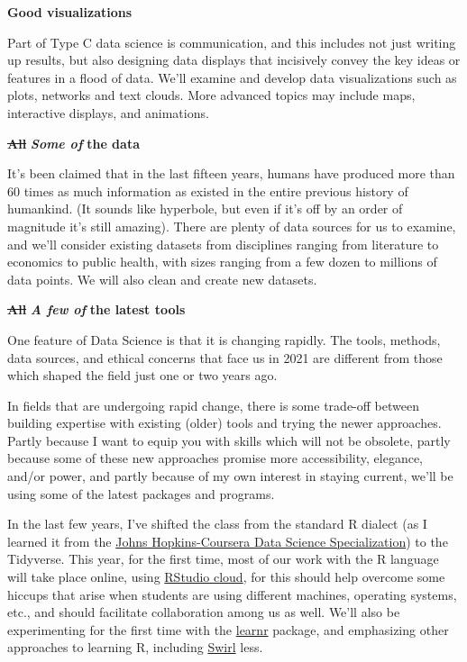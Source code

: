 \documentclass[
  openany]{book}
\begin{document}
\textbf{Good visualizations}

Part of Type C data science is communication, and this includes not just writing up results, but also designing data displays that incisively convey the key ideas or features in a flood of data. We'll examine and develop data visualizations such as plots, networks and text clouds. More advanced topics may include maps, interactive displays, and animations.

\sout{\textbf{All}} \textbf{\emph{Some of}} \textbf{the data}

It's been claimed that in the last fifteen years, humans have produced more than 60 times as much information as existed in the entire previous history of humankind. (It sounds like hyperbole, but even if it's off by an order of magnitude it's still amazing). There are plenty of data sources for us to examine, and we'll consider existing datasets from disciplines ranging from literature to economics to public health, with sizes ranging from a few dozen to millions of data points. We will also clean and create new datasets.

\sout{\textbf{All}} \textbf{\emph{A few of}} \textbf{the latest tools}

One feature of Data Science is that it is changing rapidly. The tools, methods, data sources, and ethical concerns that face us in 2021 are different from those which shaped the field just one or two years ago.

In fields that are undergoing rapid change, there is some trade-off between building expertise with existing (older) tools and trying the newer approaches. Partly because I want to equip you with skills which will not be obsolete, partly because some of these new approaches promise more accessibility, elegance, and/or power, and partly because of my own interest in staying current, we'll be using some of the latest packages and programs.

In the last few years, I've shifted the class from the standard R dialect (as I learned it from the \href{https://www.coursera.org/specializations/jhu-data-science}{Johns Hopkins-Coursera Data Science Specialization}) to the Tidyverse. This year, for the first time, most of our work with the R language will take place online, using \href{https://rstudio.cloud/}{RStudio cloud}, for this should help overcome some hiccups that arise when students are using different machines, operating systems, etc., and should facilitate collaboration among us as well. We'll also be experimenting for the first time with the \href{https://rstudio.github.io/learnr/}{learnr} package, and emphasizing other approaches to learning R, including \href{https://swirlstats.com/}{Swirl} less.
\end{document}
